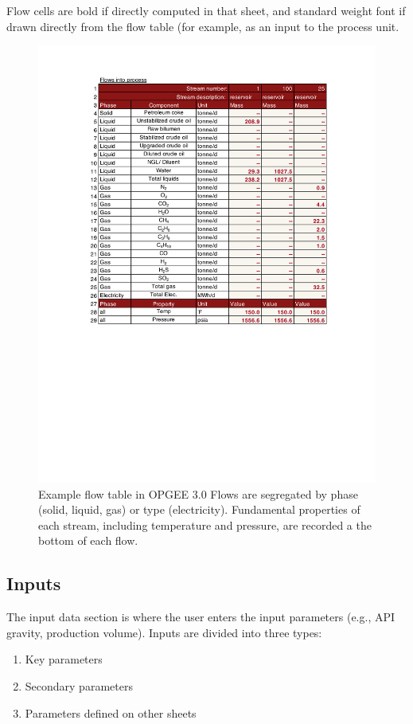 \documentclass[11pt]{report}
\begin{document}
Flow cells are bold if directly computed in that sheet, and standard weight font if drawn directly from the flow table (for example, as an input to the process unit.

\begin{figure}[t]
\includegraphics[width=0.8\columnwidth]{images/FlowTable.pdf}
\caption{Example flow table in OPGEE 3.0  Flows are segregated by phase (solid, liquid, gas) or type (electricity). Fundamental properties of each stream, including temperature and pressure, are recorded a the bottom of each flow.}
\label{fig:FlowTable}
\end{figure}

\subsection {Inputs}

The input data section is where the user enters the input parameters (e.g., API gravity, production volume). Inputs are divided into three types:
\begin{enumerate}
\item Key parameters
\item Secondary parameters
\item Parameters defined on other sheets
\end{enumerate}
\end{document}
